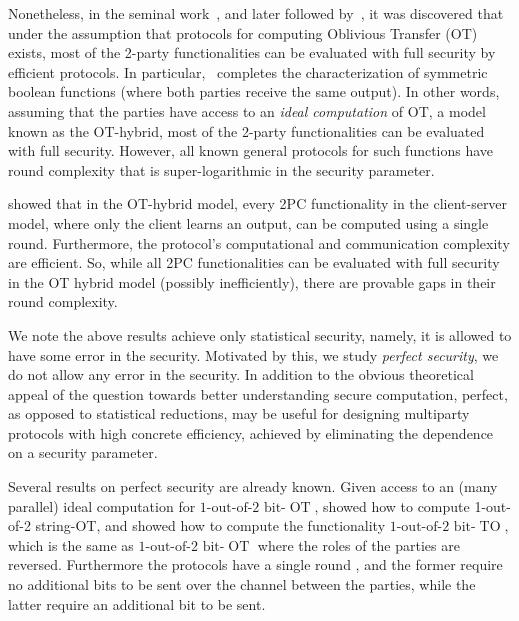 \documentclass{llncs}
\newcommand{\bnote}[1]{\authnote{Bar}{#1}}
\newcommand{\OT}{\operatorname{OT}}
\newcommand{\bOT}[2]{#1\text{-out-of-}#2\text{ bit-}\OT}
\newcommand{\TO}[2]{#1\text{-out-of-}#2\text{ bit-}\operatorname{TO}}
\begin{document}
Nonetheless, in the seminal work~\cite{GHKL08}, and later followed by~\cite{Ash14,makriyannis2014classification,asharov2015complete}, it was discovered that under the assumption that protocols for computing Oblivious Transfer (OT) exists, most of the 2-party functionalities can be evaluated with full security by efficient protocols. In particular,~\cite{asharov2015complete} completes the characterization of symmetric boolean functions (where both parties receive the same output). In other words, assuming that the parties have access to an \emph{ideal computation} of OT, a model known as the OT-hybrid, most of the 2-party functionalities can be evaluated with full security. However, all known general protocols for such functions have round complexity that is super-logarithmic in the security parameter.
 
\citet{IKOPS11} showed that in the OT-hybrid model, every 2PC functionality in the client-server model, where only the client learns an output, can be computed using a single round. Furthermore, the protocol's computational and communication complexity are efficient. So, while all 2PC functionalities can be evaluated with full security in the OT hybrid model (possibly inefficiently), there are provable gaps in their round complexity. 

We note the above results achieve only statistical security, namely, it is allowed to have some error in the security. Motivated by this, we study \emph{perfect security}, \ie we do not allow any error in the security. In addition to the obvious theoretical appeal of the question towards better understanding secure computation, perfect, as opposed to statistical reductions, may be useful for designing multiparty protocols with high concrete efficiency, achieved by eliminating the dependence on a security parameter.

Several results on perfect security are already known. Given access to an (many parallel) ideal computation for $\bOT12$, \cite{BCS96} showed how to compute 1-out-of-2 string-OT, and \cite{WolfW06} showed how to compute the functionality $\TO{1}{2}$, which is the same as $\bOT{1}{2}$ where the roles of the parties are reversed. Furthermore the protocols have a single round \bnote{Verify.}, and the former require no additional bits to be sent over the channel between the parties, while the latter require an additional bit to be sent. 

\end{document}

